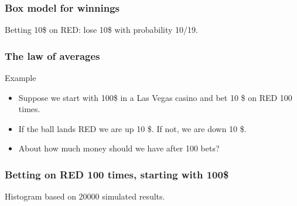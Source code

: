 \documentclass[handout]{beamer}
\begin{document}
   \begin{frame}
   \frametitle{Box model for winnings}
   \begin{center}
   \end{center}
   Betting 10\$ on {\color{red} RED}: lose 10\$ with probability 10/19.
   \end{frame}


   \begin{frame} \frametitle{The law of averages}

   \begin{block}
   {Example}
   \begin{itemize}
   \item Suppose we start with 100\$ in
   a Las Vegas casino and bet 10 \$ on {\color{red} RED} 100 times.
   \item If the ball lands  {\color{red} RED} we are up 10 \$. If not,
   we are down 10 \$.
   \item About how much money should we have after 100 bets?
   \end{itemize}
   \end{block}
   \end{frame}



   \begin{frame}
   \frametitle{Betting on {\color{red} RED} 100 times, starting with 100\$}
   \begin{center}
   \end{center}
   Histogram based on 20000 simulated results.
   \end{frame}

\end{document}
